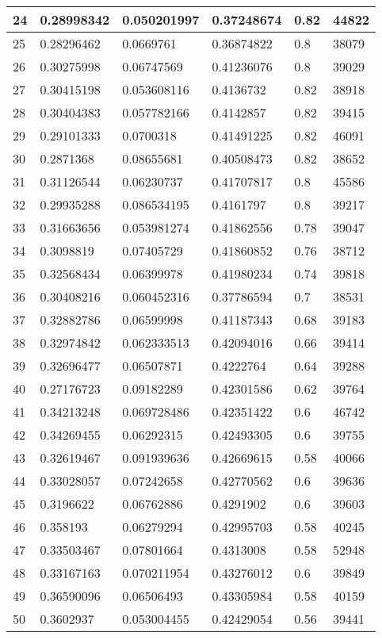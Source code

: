 \begin{longtable}{|l|l|l|l|l|l|}
24 & 0.28998342 & 0.050201997 & 0.37248674 & 0.82 & 44822 \\ \hline 
25 & 0.28296462 & 0.0669761 & 0.36874822 & 0.8 & 38079 \\ \hline 
26 & 0.30275998 & 0.06747569 & 0.41236076 & 0.8 & 39029 \\ \hline 
27 & 0.30415198 & 0.053608116 & 0.4136732 & 0.82 & 38918 \\ \hline 
28 & 0.30404383 & 0.057782166 & 0.4142857 & 0.82 & 39415 \\ \hline 
29 & 0.29101333 & 0.0700318 & 0.41491225 & 0.82 & 46091 \\ \hline 
30 & 0.2871368 & 0.08655681 & 0.40508473 & 0.82 & 38652 \\ \hline 
31 & 0.31126544 & 0.06230737 & 0.41707817 & 0.8 & 45586 \\ \hline 
32 & 0.29935288 & 0.086534195 & 0.4161797 & 0.8 & 39217 \\ \hline 
33 & 0.31663656 & 0.053981274 & 0.41862556 & 0.78 & 39047 \\ \hline 
34 & 0.3098819 & 0.07405729 & 0.41860852 & 0.76 & 38712 \\ \hline 
35 & 0.32568434 & 0.06399978 & 0.41980234 & 0.74 & 39818 \\ \hline 
36 & 0.30408216 & 0.060452316 & 0.37786594 & 0.7 & 38531 \\ \hline 
37 & 0.32882786 & 0.06599998 & 0.41187343 & 0.68 & 39183 \\ \hline 
38 & 0.32974842 & 0.062333513 & 0.42094016 & 0.66 & 39414 \\ \hline 
39 & 0.32696477 & 0.06507871 & 0.4222764 & 0.64 & 39288 \\ \hline 
40 & 0.27176723 & 0.09182289 & 0.42301586 & 0.62 & 39764 \\ \hline 
41 & 0.34213248 & 0.069728486 & 0.42351422 & 0.6 & 46742 \\ \hline 
42 & 0.34269455 & 0.06292315 & 0.42493305 & 0.6 & 39755 \\ \hline 
43 & 0.32619467 & 0.091939636 & 0.42669615 & 0.58 & 40066 \\ \hline 
44 & 0.33028057 & 0.07242658 & 0.42770562 & 0.6 & 39636 \\ \hline 
45 & 0.3196622 & 0.06762886 & 0.4291902 & 0.6 & 39603 \\ \hline 
46 & 0.358193 & 0.06279294 & 0.42995703 & 0.58 & 40245 \\ \hline 
47 & 0.33503467 & 0.07801664 & 0.4313008 & 0.58 & 52948 \\ \hline 
48 & 0.33167163 & 0.070211954 & 0.43276012 & 0.6 & 39849 \\ \hline 
49 & 0.36590096 & 0.06506493 & 0.43305984 & 0.58 & 40159 \\ \hline 
50 & 0.3602937 & 0.053004455 & 0.42429054 & 0.56 & 39441 \\ \hline 
\end{longtable}